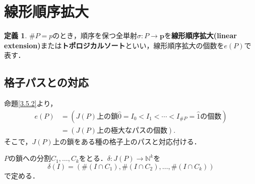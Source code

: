\documentclass[xelatex,ja=standard,a4paper,14pt,everyparhook=compat]{bxjsarticle}
\newcommand{\bbN}{\mathbb{N}}
\theoremstyle{definition}
\newtheorem*{definition*}{定義}
\begin{document}
\section{線形順序拡大}

\begin{definition*}
    $\#P = p$のとき，順序を保つ全単射$\sigma: P \to \bm{p}$を\textbf{線形順序拡大(linear extension)}または\textbf{トポロジカルソート}といい，線形順序拡大の個数を$e(P)$で表す．
\end{definition*}

\subsection{格子パスとの対応}

命題\ref{3.5.2}より， \begin{align*}
    e(P) & = (\text{$J(P)$上の鎖$\hat 0 = I_0 < I_1 < \cdots < I_{\#P} = \hat 1$の個数}) \\
         & = (\text{$J(P)$上の極大なパスの個数}).
\end{align*}
そこで，$J(P)$上の鎖をある種の格子上のパスと対応付ける．

$P$の鎖への分割$C_1,\ldots,C_k$をとる．$\delta: J(P) \to \bbN^k$を \begin{equation*}
    \delta(I) = (\#(I \cap C_1), \#(I \cap C_2), \ldots, \#(I \cap C_k))
\end{equation*}
で定める．

\newpage
\end{document}
